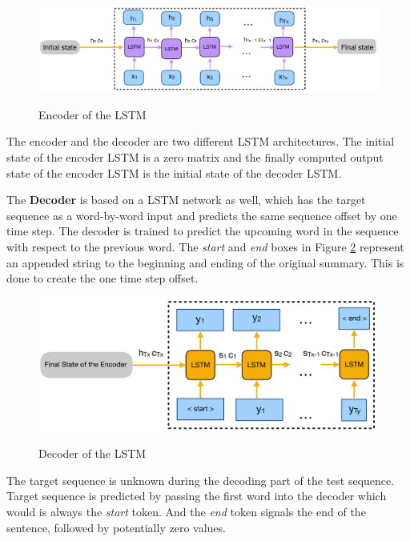 \begin{figure}
	\begin{center}
		\includegraphics[width=6in]{photos/trainenc-1}\\
		\caption{Encoder of the LSTM}\label{trainenc}
	\end{center}
\end{figure}

The encoder and the decoder are two different LSTM architectures. The initial state of the encoder LSTM is a zero matrix and the finally computed output state of the encoder LSTM is the initial state of the decoder LSTM.

The \textbf{Decoder} is based on a LSTM network as well, which has the target sequence as a word-by-word input and predicts the same sequence offset by one time step. The decoder is trained to predict the upcoming word in the sequence with respect to the previous word. The \textit{start} and \textit{end} boxes in Figure \ref{traindec} represent an appended string to the beginning and ending of the original summary. This is done to create the one time step offset.

\begin{figure}
	\begin{center}
		\includegraphics[width=6in]{photos/traindec-1}\\
		\caption{Decoder of the LSTM}\label{traindec}
	\end{center}
\end{figure}

The target sequence is unknown during the decoding part of the test sequence. Target sequence is predicted by passing the first word into the decoder which would is always the \textit{start} token. And the \textit{end} token signals the end of the sentence, followed by potentially zero values.


